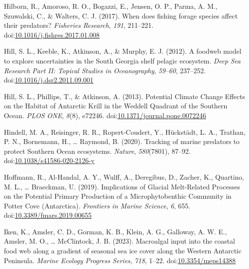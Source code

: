 \documentclass[
]{article}
\newlength{\cslhangindent}
\newlength{\cslentryspacingunit} %
\newenvironment{CSLReferences}[2] %
 {%
  \setlength{\parindent}{0pt}
  \ifodd #1
  \let\oldpar\par
  \def\par{\hangindent=\cslhangindent\oldpar}
  \fi
  \setlength{\parskip}{#2\cslentryspacingunit}
 }%
 {}
\begin{document}
\begin{CSLReferences}{1}{0}
\leavevmode{}%
Hilborn, R., Amoroso, R. O., Bogazzi, E., Jensen, O. P., Parma, A. M.,
Szuwalski, C., \& Walters, C. J. (2017). When does fishing forage
species affect their predators? \emph{Fisheries Research}, \emph{191},
211--221.
doi:\href{https://doi.org/10.1016/j.fishres.2017.01.008}{10.1016/j.fishres.2017.01.008}

\leavevmode{}%
Hill, S. L., Keeble, K., Atkinson, A., \& Murphy, E. J. (2012). A
foodweb model to explore uncertainties in the {South Georgia} shelf
pelagic ecosystem. \emph{Deep Sea Research Part II: Topical Studies in
Oceanography}, \emph{59--60}, 237--252.
doi:\href{https://doi.org/10.1016/j.dsr2.2011.09.001}{10.1016/j.dsr2.2011.09.001}

\leavevmode{}%
Hill, S. L., Phillips, T., \& Atkinson, A. (2013). Potential {Climate
Change Effects} on the {Habitat} of {Antarctic Krill} in the {Weddell
Quadrant} of the {Southern Ocean}. \emph{PLOS ONE}, \emph{8}(8), e72246.
doi:\href{https://doi.org/10.1371/journal.pone.0072246}{10.1371/journal.pone.0072246}

\leavevmode{}%
Hindell, M. A., Reisinger, R. R., Ropert-Coudert, Y., Hückstädt, L. A.,
Trathan, P. N., Bornemann, H., \ldots{} Raymond, B. (2020). Tracking of
marine predators to protect {Southern Ocean} ecosystems. \emph{Nature},
\emph{580}(7801), 87--92.
doi:\href{https://doi.org/10.1038/s41586-020-2126-y}{10.1038/s41586-020-2126-y}

\leavevmode{}%
Hoffmann, R., Al-Handal, A. Y., Wulff, A., Deregibus, D., Zacher, K.,
Quartino, M. L., \ldots{} Braeckman, U. (2019). Implications of {Glacial
Melt-Related Processes} on the {Potential Primary Production} of a
{Microphytobenthic Community} in {Potter Cove} ({Antarctica}).
\emph{Frontiers in Marine Science}, \emph{6}, 655.
doi:\href{https://doi.org/10.3389/fmars.2019.00655}{10.3389/fmars.2019.00655}

\leavevmode{}%
Iken, K., Amsler, C. D., Gorman, K. B., Klein, A. G., Galloway, A. W.
E., Amsler, M. O., \ldots{} McClintock, J. B. (2023). Macroalgal input
into the coastal food web along a gradient of seasonal sea ice cover
along the {Western Antarctic Peninsula}. \emph{Marine Ecology Progress
Series}, \emph{718}, 1--22.
doi:\href{https://doi.org/10.3354/meps14388}{10.3354/meps14388}


\end{CSLReferences}
\end{document}
